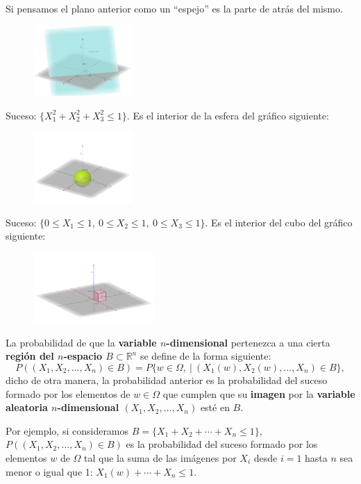 \documentclass[]{book}
\begin{document}
Si pensamos el plano anterior como un ``espejo'' es la parte de atrás del mismo.

\begin{figure}
\includegraphics[width=1.48in]{Images/EjPlano3D} \end{figure}

Suceso: \(\{X_1^2+X_2^2+X_3^2\leq 1\}\). Es el interior de la esfera del gráfico siguiente:

\begin{figure}
\includegraphics[width=1.48in]{Images/EjEsfera3D} \end{figure}

Suceso: \(\{0\leq X_1\leq 1,\ 0\leq X_2\leq 1,\ 0\leq X_3\leq 1\}\). Es el interior del cubo del gráfico siguiente:

\begin{figure}
\includegraphics[width=1.81in]{Images/Ej3DCubo} \end{figure}

La probabilidad de que la \textbf{variable \(n\)-dimensional} pertenezca a una cierta \textbf{región del \(n\)-espacio \(B\subset \mathbb{R}^n\)} se define de la forma siguiente:
\[
P((X_1,X_2,\ldots,X_n)\in B)=P\{w\in \Omega,\ |\ (X_1(w),X_2(w),\ldots,X_n)\in B\},
\]
dicho de otra manera, la probabilidad anterior es la probabilidad del suceso formado por los elementos de \(w\in\Omega\) que cumplen que su \textbf{imagen} por la \textbf{variable aleatoria \(n\)-dimensional \((X_1,X_2,\ldots,X_n)\)} esté en \(B\).

Por ejemplo, si consideramos \(B=\{X_1+X_2+\cdots +X_n\leq 1\}\), \(P((X_1,X_2,\ldots,X_n)\in B)\) es la probabilidad del suceso formado por los elementos \(w\) de \(\Omega\) tal que la suma de las imágenes por \(X_i\) desde \(i=1\) hasta \(n\) sea menor o igual que 1: \(X_1(w)+\cdots +X_n\leq 1\).
\end{document}
